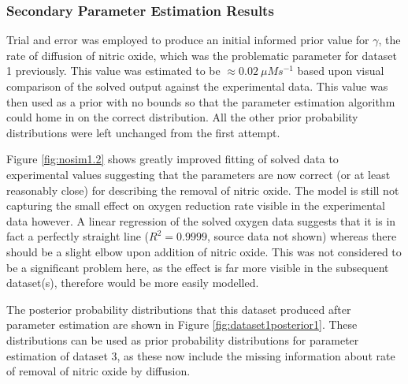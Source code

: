 \subsubsection{Secondary Parameter Estimation Results}
Trial and error was employed to produce an initial informed prior value for $\gamma$, the rate of diffusion of nitric oxide, which was the problematic parameter for dataset 1 previously. This value was estimated to be $\approx 0.02~\mu Ms^{-1}$ based upon visual comparison of the solved output against the experimental data. This value was then used as a prior with no bounds so that the parameter estimation algorithm could home in on the correct distribution. All the other prior probability distributions were left unchanged from the first attempt.

Figure \ref{fig:nosim1.2} shows greatly improved fitting of solved data to experimental values suggesting that the parameters are now correct (or at least reasonably close) for describing the removal of nitric oxide. The model is still not capturing the small effect on oxygen reduction rate visible in the experimental data however. A linear regression of the solved oxygen data suggests that it is in fact a perfectly straight line ($R^2=0.9999$, source data not shown) whereas there should be a slight elbow upon addition of nitric oxide. This was not considered to be a significant problem here, as the effect is far more visible in the subsequent dataset(s), therefore would be more easily modelled.

The posterior probability distributions that this dataset produced after parameter estimation are shown in Figure \ref{fig:dataset1posterior1}. These distributions can be used as prior probability distributions for parameter estimation of dataset 3, as these now include the missing information about rate of removal of nitric oxide by diffusion.

